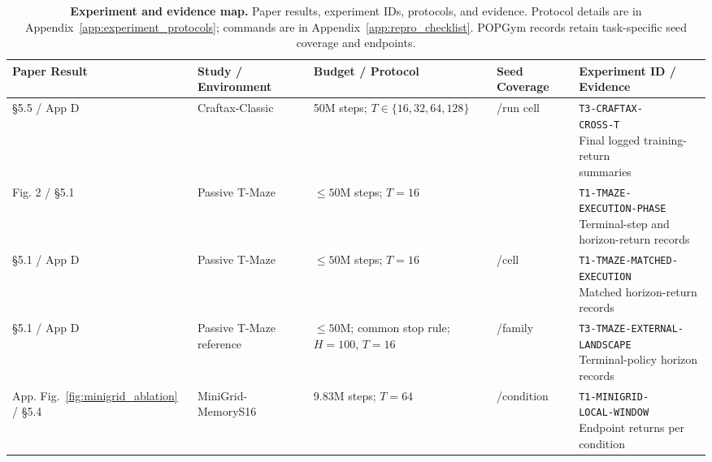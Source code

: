 \begin{table}[htbp]
\caption{\textbf{Experiment and evidence map.} Paper results, experiment IDs, protocols, and evidence. Protocol details are in Appendix~\ref{app:experiment_protocols}; commands are in Appendix~\ref{app:repro_checklist}. POPGym records retain task-specific seed coverage and endpoints.}
\label{table:repro_roadmap}
\vskip 0.1in
\begin{center}
\begin{small}
\setlength{\tabcolsep}{4pt}
\begin{tabularx}{\linewidth}{@{}
    >{\raggedright\arraybackslash}p{}
    >{\raggedright\arraybackslash}p{}
    >{\raggedright\arraybackslash}p{}
    >{\raggedright\arraybackslash}p{}
    >{\raggedright\arraybackslash}X@{}}
\toprule
\textbf{Paper Result} & \textbf{Study / Environment} & \textbf{Budget / Protocol} & \textbf{Seed Coverage} & \textbf{Experiment ID / Evidence} \\
\midrule
\S 5.5 / App D & Craftax-Classic & 50M steps; $T\in\{16,32,64,128\}$ & 5/run cell & \shortstack[l]{\texttt{T3-CRAFTAX-}\\\texttt{CROSS-T}\\Final logged training-return\\summaries} \\
Fig. 2 / \S 5.1 & Passive T-Maze & $\leq50$M steps; $T=16$ & 10 & \shortstack[l]{\texttt{T1-TMAZE-}\\\texttt{EXECUTION-PHASE}\\Terminal-step and\\horizon-return records} \\
\S 5.1 / App D & Passive T-Maze & $\leq50$M steps; $T=16$ & 10/cell & \shortstack[l]{\texttt{T1-TMAZE-MATCHED-}\\\texttt{EXECUTION}\\Matched horizon-return records} \\
\S 5.1 / App D & Passive T-Maze reference & $\leq50$M; common stop rule; $H=100$, $T=16$ & 7/family & \shortstack[l]{\texttt{T3-TMAZE-EXTERNAL-}\\\texttt{LANDSCAPE}\\Terminal-policy horizon records} \\
App. Fig.~\ref{fig:minigrid_ablation} / \S 5.4 & MiniGrid-MemoryS16 & 9.83M steps; $T=64$ & 15/condition & \shortstack[l]{\texttt{T1-MINIGRID-}\\\texttt{LOCAL-WINDOW}\\Endpoint returns per condition} \\

\end{tabularx}
\end{small}
\end{center}
\end{table}
